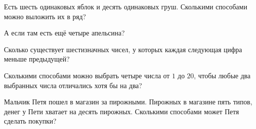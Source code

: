 \begin{problems}

\item
Есть шесть одинаковых яблок и десять одинаковых груш.
Сколькими способами можно выложить их в ряд?

\item
А если там есть ещё четыре апельсина?

\item
Сколько существует шестизначных чисел, у которых каждая следующая цифра меньше
предыдущей?

\item
Сколькими способами можно выбрать четыре числа от $1$ до $20$, чтобы любые два
выбранных числа отличались хотя бы на два?

\item
Мальчик Петя пошел в магазин за пирожными.
Пирожных в магазине пять типов, денег у Пети хватает на десять пирожных.
Сколькими способами может Петя сделать покупки?

\end{problems}

